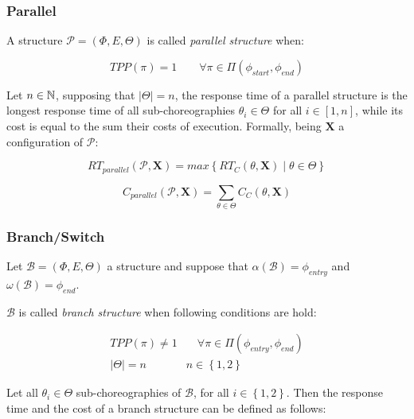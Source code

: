\subsubsection{Parallel}

A structure $\mathcal{P} = (\Phi,E,\Theta)$ is called \textit{parallel structure} when:

\begin{equation}
	TPP(\pi) = 1 \qquad \forall \pi \in \Pi(\phi_{start}, \phi_{end})
\end{equation}

Let $n \in \mathbb{N}$, supposing that $|\Theta| = n$, the response time of a parallel structure is the longest response time of all sub-choreographies $\theta_i \in \Theta$ for all $i \in \left[ 1, n \right]$, while its cost is equal to the sum their costs of execution. Formally, being $\textbf{X}$ a configuration of  $\mathcal{P}$:

\begin{equation}
	RT_{parallel}(\mathcal{P}, \textbf{X}) = max \left\lbrace RT_C(\mathcal{\theta}, \textbf{X}) \mid \theta \in \Theta \right\rbrace 
\end{equation}

\begin{equation}
	C_{parallel}(\mathcal{P}, \textbf{X}) = \sum_{\theta \in \Theta} C_C(\theta, \textbf{X})
\end{equation}



\subsubsection{Branch/Switch}

Let $\mathcal{B} = (\Phi,E,\Theta)$ a structure and suppose that $\alpha(\mathcal{B}) = \phi_{entry}$ and $\omega(\mathcal{B}) = \phi_{end}$. 

$\mathcal{B}$ is called \textit{branch structure} when following conditions are hold:

\begin{eqnarray}
	TPP(\pi) \neq 1  & \quad \forall \pi \in \Pi(\phi_{entry}, \phi_{end}) \\
    |\Theta| = n  & n \in \left\lbrace 1,2 \right\rbrace 
\end{eqnarray}

Let all $\theta_i \in \Theta$ sub-choreographies of $\mathcal{B}$, for all $i \in \left\lbrace 1,2 \right\rbrace $. Then the response time and the cost of a branch structure can be defined as follows:


